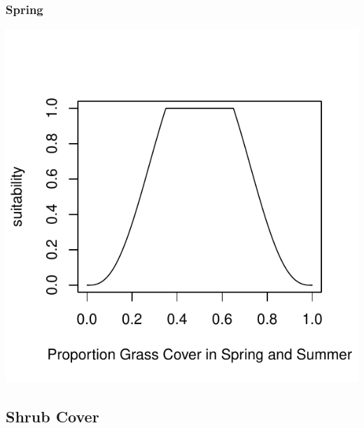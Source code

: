 \documentclass[12pt,letterpaper]{article}\usepackage{graphicx, color}
\makeatletter
\def\maxwidth{ %
  \ifdim\Gin@nat@width>\linewidth
    \linewidth
  \else
    \Gin@nat@width
  \fi
}
\newenvironment{knitrout}{}{} %
\makeatother
\begin{document}
\subsubsection{Spring}
\begin{knitrout}
\color{fgcolor}\includegraphics[width=\maxwidth]{figure/Sally-Dan_Forb_Cover_spring} 
\end{knitrout}

\subsection{Shrub Cover}
\end{document}
